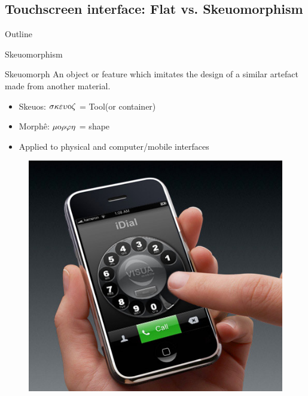 \documentclass{beamer}
\begin{document}
\subsection{Touchscreen interface: Flat vs. Skeuomorphism}

\begin{frame}{Outline}
    \tableofcontents[currentsection]
\end{frame}


	\begin{frame}{Skeuomorphism}
	\begin{block}{Skeuomorph}
	An object or feature which imitates the design of a similar artefact made from another material.
	\end{block}
	\begin{itemize}
	\item Skeuos: $\sigma \kappa \varepsilon \upsilon {\rm o} \zeta$ = Tool(or container)
	\item Morphê: $\mu {\rm o} \rho \varphi \eta$ = shape
	\item Applied to physical and computer/mobile interfaces
	\end{itemize}
        \begin{figure}
    \includegraphics[scale=0.25]{idial.jpg}
    \end{figure}
    

	\end{frame}
\end{document}
